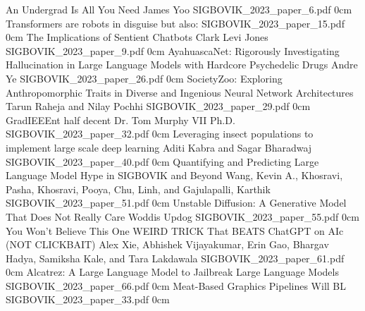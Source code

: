 \renewcommand{\thepage}{\roman{page}}
\setcounter{page}{3}

\newpage
\renewcommand{\thepage}{\arabic{page}}
\setcounter{page}{1}

\newcommand{\link}[2][]{\vspace{-1in} {\scriptsize #1 \url{#2}} \raisebox{-0.5\height}{\texttt{[image: participation]}}}
\newcommand{\badge}[1]{\texttt{[image: badges/badge\_\#1]}}
\newcommand{\badges}[1]{\vspace{-1in} \raisebox{-0.5\height}{#1}}

\addpaper
	{An Undergrad Is All You Need}
	{James Yoo}
	{}
	{SIGBOVIK_2023_paper_6.pdf}
	{0cm}
	{}
\addpaper
	{Transformers are robots in disguise but also:}
	{}
	{}
	{SIGBOVIK_2023_paper_15.pdf}
	{0cm}
	{}
\addpaper
	{The Implications of Sentient Chatbots}
	{Clark Levi Jones}
	{}
	{SIGBOVIK_2023_paper_9.pdf}
	{0cm}
	{}
\addpaper
	{AyahuascaNet: Rigorously Investigating Hallucination in Large Language Models with Hardcore Psychedelic Drugs}
	{Andre Ye}
	{}
	{SIGBOVIK_2023_paper_26.pdf}
	{0cm}
	{}
\addpaper
	{SocietyZoo: Exploring Anthropomorphic Traits in Diverse and Ingenious Neural Network Architectures}
	{Tarun Raheja and Nilay Pochhi}
	{}
	{SIGBOVIK_2023_paper_29.pdf}
	{0cm}
	{}
\addpaper
	{GradIEEEnt half decent}
	{Dr. Tom Murphy VII Ph.D.}
	{}
	{SIGBOVIK_2023_paper_32.pdf}
	{0cm}
	{}
\addpaper
	{Leveraging insect populations to implement large scale deep learning}
	{Aditi Kabra and Sagar Bharadwaj}
	{}
	{SIGBOVIK_2023_paper_40.pdf}
	{0cm}
	{}
\addpaper
	{Quantifying and Predicting Large Language Model Hype in SIGBOVIK and Beyond}
	{Wang, Kevin A., Khosravi, Pasha, Khosravi, Pooya, Chu, Linh, and Gajulapalli, Karthik}
	{}
	{SIGBOVIK_2023_paper_51.pdf}
	{0cm}
	{}
\addpaper
	{Unstable Diffusion: A Generative Model That Does Not Really Care}
	{Woddis Updog}
	{}
	{SIGBOVIK_2023_paper_55.pdf}
	{0cm}
	{}
\addpaper
	{You Won't Believe This One WEIRD TRICK That BEATS ChatGPT on AI{\small c} (NOT CLICKBAIT)}
	{Alex Xie, Abhishek Vijayakumar, Erin Gao, Bhargav Hadya, Samiksha Kale, and Tara Lakdawala}
	{}
	{SIGBOVIK_2023_paper_61.pdf}
	{0cm}
	{}
\addpaper
	{Alcatrez: A Large Language Model to Jailbreak Large Language Models}
	{}
	{}
	{SIGBOVIK_2023_paper_66.pdf}
	{0cm}
	{}
\addpaper
	{Meat-Based Graphics Pipelines}
	{Will BL}
	{}
	{SIGBOVIK_2023_paper_33.pdf}
	{0cm}
	{}

